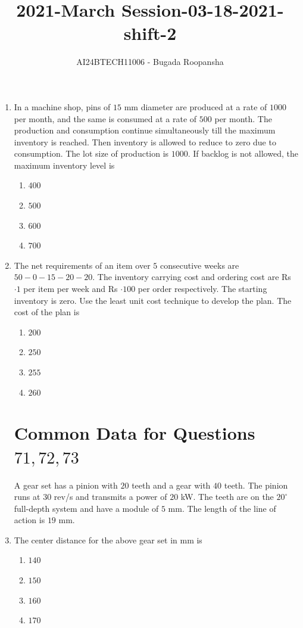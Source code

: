 \documentclass[journal,12pt,twocolumn]{IEEEtran}
\theoremstyle{remark}
\begin{document}

\vspace{3cm}
\title{2021-March Session-03-18-2021-shift-2}
\author{AI24BTECH11006 - Bugada Roopansha}
\maketitle
\begin{enumerate}[start=69]
\item In a machine shop, pins of $15$ mm diameter are produced at a rate of $1000$ per month, and the same is consumed at a rate of $500$ per month. The production and consumption continue simultaneously till the maximum inventory is reached. Then inventory is allowed to reduce to zero due to consumption. The lot size of production is $1000$. If backlog is not allowed, the maximum inventory level is
\begin{enumerate}
    \item $400$
    \item $500$
    \item $600$
    \item $700$
\end{enumerate}
\item The net requirements of an item over $5$ consecutive weeks are $50-0-15-20-20$. The inventory carrying cost and ordering cost are Rs $\cdot1$ per item per week and Rs $\cdot100$ per order respectively. The starting inventory is zero. Use the least unit cost technique to develop the plan. The cost of the plan  is
    \begin{enumerate}
        \item $200$
        \item $250$
        \item $255$
        \item $260$
    \end{enumerate}
\section{Common Data for Questions$ 71, 72, 73$}    
A gear set has a pinion with $20$ teeth and a gear with $40$ teeth. The pinion runs at $30$ rev/s and transmits a power of $20$ kW. The teeth are on the $20^\circ$ full-depth system and have a module of $5$ mm. The length of the line of action is $19$ mm.
    \item The center distance for the above gear set in mm is
    \begin{enumerate}
        \item $140$
        \item $150$
        \item $160$
        \item $170$
    \end{enumerate}
    

\end{enumerate}
\end{document}
